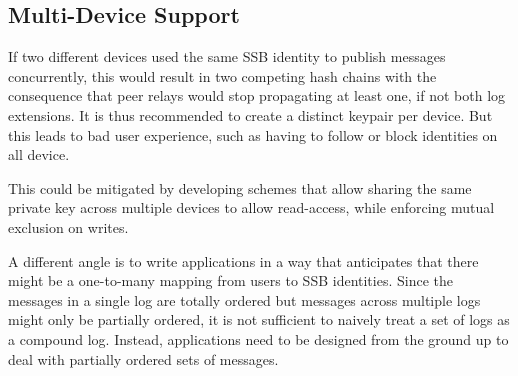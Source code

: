 \documentclass[9pt,sigconf]{acmart}
\begin{document}



\subsection{Multi-Device Support}

If two different devices used the same SSB identity to publish messages concurrently, this would result in two competing hash chains with the consequence that peer relays would stop propagating at least one, if not both log extensions. It is thus recommended to create a distinct keypair per device. But this leads to bad user experience, such as having to follow or block identities on all device.

This could be mitigated by developing schemes that allow sharing the same private key across multiple devices to allow read-access, while enforcing mutual exclusion on writes.

A different angle is to write applications in a way that anticipates that there might be a one-to-many mapping from users to SSB identities. Since the messages in a single log are totally ordered but messages across multiple logs might only be partially ordered, it is not sufficient to naively treat a set of logs as a compound log. Instead, applications need to be designed from the ground up to deal with partially ordered sets of messages.

\end{document}
